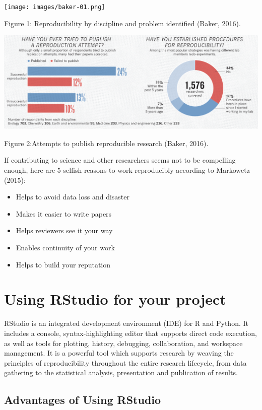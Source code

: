 \documentclass[
]{article}
\begin{document}
\texttt{[image: images/baker-01.png]}

Figure 1: Reproducibility by discipline and problem identified (Baker,
2016).

\includegraphics[width=6.5in,height=\textheight]{images/baker-02.png}

Figure 2:Attempts to publish reproducible research (Baker, 2016).

If contributing to science and other researchers seems not to be
compelling enough, here are 5 selfish reasons to work reproducibly
according to Markowetz (2015):

\begin{itemize}
\item
  Helps to avoid data loss and disaster
\item
  Makes it easier to write papers
\item
  Helps reviewers see it your way
\item
  Enables continuity of your work
\item
  Helps to build your reputation
\end{itemize}

\hypertarget{using-rstudio-for-your-project}{%
\section{Using RStudio for your
project}\label{using-rstudio-for-your-project}}

RStudio is an integrated development environment (IDE) for R and Python.
It includes a console, syntax-highlighting editor that supports direct
code execution, as well as tools for plotting, history, debugging,
collaboration, and workspace management. It is a powerful tool which
supports research by weaving the principles of reproducibility
throughout the entire research lifecycle, from data gathering to the
statistical analysis, presentation and publication of results.

\hypertarget{advantages-of-using-rstudio}{%
\subsection{Advantages of Using
RStudio}\label{advantages-of-using-rstudio}}
\end{document}
